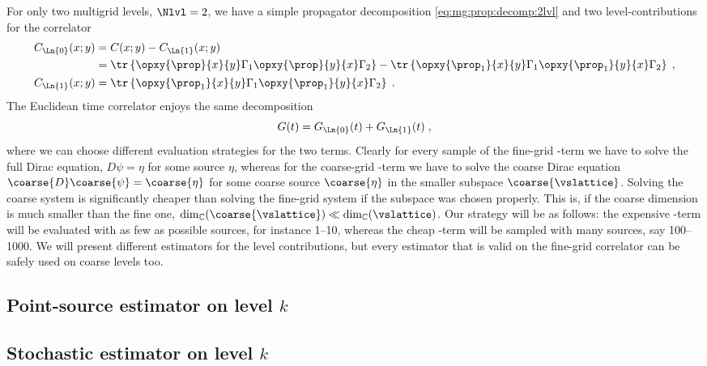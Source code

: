 For only two multigrid levels, $\Nlvl=2$, we have a simple propagator decomposition \cref{eq:mg:prop:decomp:2lvl} and two level-contributions for the correlator
\begin{align}
&\begin{aligned}
C_{\Ln{0}}(x;y)
&= C(x;y) - C_{\Ln{1}}(x;y) \\
&= \tr \left\{ \opxy{\prop}{x}{y} \Gamma_1 \opxy{\prop}{y}{x} \Gamma_2 \right\}
 - \tr \left\{ \opxy{\prop_{1}}{x}{y} \Gamma_1 \opxy{\prop_{1}}{y}{x} \Gamma_2 \right\} \;,
\end{aligned} \\
&C_{\Ln{1}}(x;y)
= \tr \left\{ \opxy{\prop_{1}}{x}{y} \Gamma_1 \opxy{\prop_{1}}{y}{x} \Gamma_2 \right\} \;.
\end{align}
The Euclidean time correlator enjoys the same decomposition
\begin{equation}
G(t) = G_{\Ln{0}}(t) + G_{\Ln{1}}(t) \;,
\end{equation}
where we can choose different evaluation strategies for the two terms.
Clearly for every sample of the fine-grid -term we have to solve the full Dirac equation, $D \psi = \eta$ for some source $\eta$, whereas for the coarse-grid -term we have to solve the coarse Dirac equation $\coarse{D} \coarse{\psi} = \coarse{\eta}$ for some coarse source $\coarse{\eta}$ in the smaller subspace $\coarse{\vslattice}$.
Solving the coarse system is significantly cheaper than solving the fine-grid system if the subspace was chosen properly.
This is, if the coarse dimension is much smaller than the fine one, $\dim_{\mathbb{C}}(\coarse{\vslattice}) \ll \dim_{\mathbb{C}}(\vslattice)$.
Our strategy will be as follows: the expensive -term will be evaluated with as few as possible sources, for instance \numrange{1}{10}, whereas the cheap -term will be sampled with many sources, say \numrange{100}{1000}.
We will present different estimators for the level contributions, but every estimator that is valid on the fine-grid correlator can be safely used on coarse levels too.

\subsection{Point-source estimator on level $k$}


\subsection{Stochastic estimator on level $k$}

